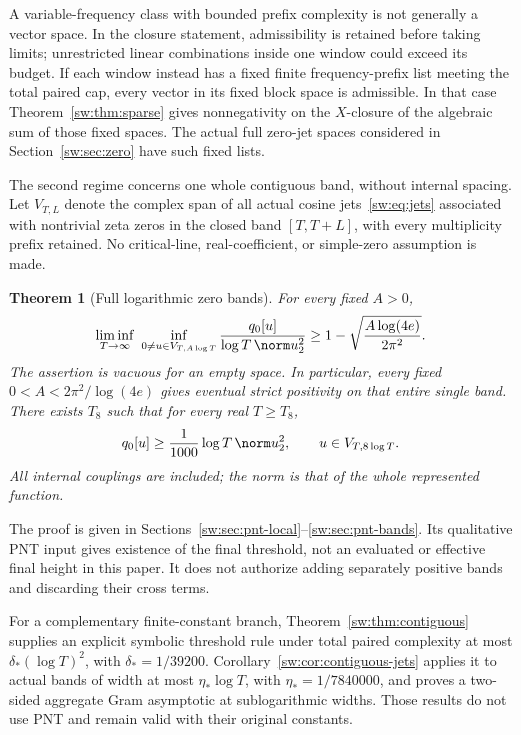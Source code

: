 \documentclass[11pt,a4paper]{article}
\numberwithin{equation}{section}
\newtheorem{theorem}{Theorem}[section]
\theoremstyle{definition}\newtheorem{definition}[theorem]{Definition}
\theoremstyle{remark}\newtheorem{remark}[theorem]{Remark}
\begin{document}
A variable-frequency class with bounded prefix complexity is not generally a vector space. In the closure statement, admissibility is retained before taking limits; unrestricted linear combinations inside one window could exceed its budget. If each window instead has a fixed finite frequency-prefix list meeting the total paired cap, every vector in its fixed block space is admissible. In that case Theorem~\ref{sw:thm:sparse} gives nonnegativity on the $X$-closure of the algebraic sum of those fixed spaces. The actual full zero-jet spaces considered in Section~\ref{sw:sec:zero} have such fixed lists.

The second regime concerns one whole contiguous band, without internal spacing. Let $V_{T,L}$ denote the complex span of all actual cosine jets~\eqref{sw:eq:jets} associated with nontrivial zeta zeros in the closed band $[T,T+L]$, with every multiplicity prefix retained. No critical-line, real-coefficient, or simple-zero assumption is made.

\begin{theorem}[Full logarithmic zero bands]\label{sw:thm:pnt-bands}
For every fixed $A>0$,
\begin{equation}\label{sw:eq:pnt-band-liminf}
 \liminf_{T\to\infty}\ \inf_{0\ne u\in V_{T,A\log T}}
 \frac{q_0[u]}{\log T\,\norm u_2^2}
 \ge1-\sqrt{\frac{A\log(4e)}{2\pi^2}}.
\end{equation}
The assertion is vacuous for an empty space. In particular, every fixed $0<A<2\pi^2/\log(4e)$ gives eventual strict positivity on that entire single band. There exists $T_8$ such that for every real $T\ge T_8$,
\begin{equation}\label{sw:eq:eight-band}
 q_0[u]\ge\frac1{1000}\log T\,\norm u_2^2,
 \qquad u\in V_{T,8\log T}.
\end{equation}
All internal couplings are included; the norm is that of the whole represented function.
\end{theorem}
The proof is given in Sections~\ref{sw:sec:pnt-local}--\ref{sw:sec:pnt-bands}. Its qualitative PNT input gives existence of the final threshold, not an evaluated or effective final height in this paper. It does not authorize adding separately positive bands and discarding their cross terms.

For a complementary finite-constant branch, Theorem~\ref{sw:thm:contiguous} supplies an explicit symbolic threshold rule under total paired complexity at most $\delta_*(\log T)^2$, with $\delta_*=1/39200$. Corollary~\ref{sw:cor:contiguous-jets} applies it to actual bands of width at most $\eta_*\log T$, with $\eta_*=1/7840000$, and proves a two-sided aggregate Gram asymptotic at sublogarithmic widths. Those results do not use PNT and remain valid with their original constants.
\end{document}

